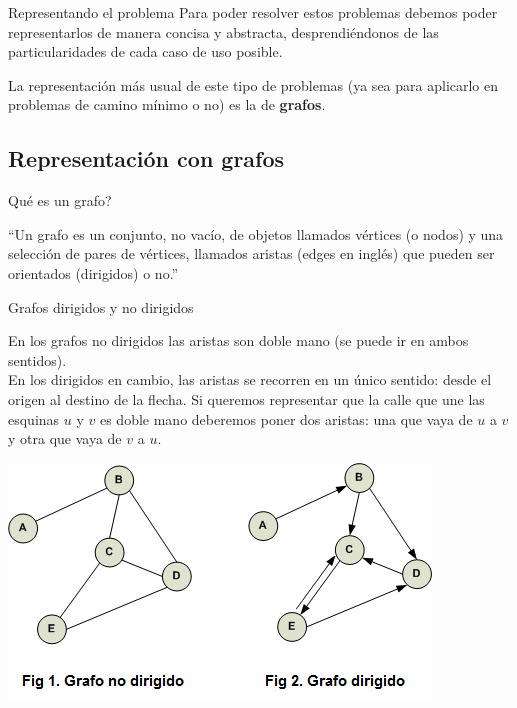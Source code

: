 \documentclass[compress]{beamer}
\begin{document}
\begin{frame}{Representando el problema}
Para poder resolver estos problemas debemos poder representarlos de manera
concisa y abstracta, desprendiéndonos de las particularidades de cada
caso de uso posible.

\bigskip

La representación más usual de este tipo de problemas (ya sea para aplicarlo
en problemas de camino mínimo o no) es la de \textbf{grafos}.
\end{frame}

\subsection{Representación con grafos}
\begin{frame}{\textquestiondown Qué es un grafo?}
\begin{exampleblock}{}
  {\large ``Un grafo es un conjunto, no vacío, de objetos llamados vértices 
  (o nodos) y una selección de pares de vértices, llamados aristas 
  (edges en inglés) que pueden ser orientados (dirigidos) o no.''}
  \vskip5mm
  \hspace*{}
\end{exampleblock}
  \pause
{}
\end{frame}

\begin{frame}{Grafos dirigidos y no dirigidos}

{\small
En los grafos no dirigidos las aristas son doble mano (se puede ir en ambos sentidos). \\
En los dirigidos en cambio, las aristas se recorren en un único sentido: desde el origen al destino de la flecha. Si queremos representar que la calle que une las esquinas $u$ y $v$ es doble mano deberemos poner dos aristas: una que vaya de $u$ a $v$ y otra que vaya de $v$ a $u$.}

\begin{center}
\includegraphics[scale=0.75]{grafos-dirigidos-y-no-dirigidos.png}
\end{center}
\end{frame}
\end{document}
